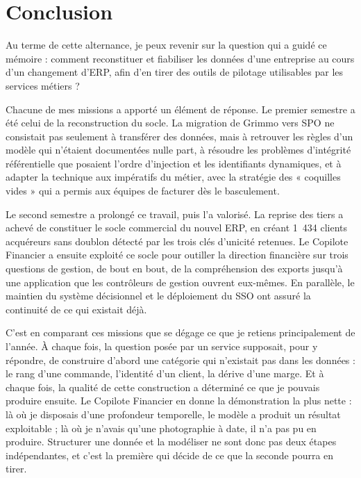 
\chapter*{Conclusion}

Au terme de cette alternance, je peux revenir sur la question qui a guidé ce mémoire : comment
reconstituer et fiabiliser les données d'une entreprise au cours d'un changement d'ERP, afin
d'en tirer des outils de pilotage utilisables par les services métiers ?

Chacune de mes missions a apporté un élément de réponse. Le premier semestre a été celui de la
reconstruction du socle. La migration de Grimmo vers SPO ne consistait pas seulement à
transférer des données, mais à retrouver les règles d'un modèle qui n'étaient documentées nulle
part, à résoudre les problèmes d'intégrité référentielle que posaient l'ordre d'injection et les
identifiants dynamiques, et à adapter la technique aux impératifs du métier, avec la stratégie
des « coquilles vides » qui a permis aux équipes de facturer dès le basculement.

Le second semestre a prolongé ce travail, puis l'a valorisé. La reprise des tiers a achevé de
constituer le socle commercial du nouvel ERP, en créant 1~434 clients acquéreurs sans doublon
détecté par les trois clés d'unicité retenues. Le Copilote Financier a ensuite exploité ce socle
pour outiller la direction financière sur trois questions de gestion, de bout en bout, de la
compréhension des exports jusqu'à une application que les contrôleurs de gestion ouvrent
eux-mêmes. En parallèle, le maintien du système décisionnel et le déploiement du SSO ont assuré
la continuité de ce qui existait déjà.

C'est en comparant ces missions que se dégage ce que je retiens principalement de l'année. À
chaque fois, la question posée par un service supposait, pour y répondre, de construire d'abord
une catégorie qui n'existait pas dans les données : le rang d'une commande, l'identité d'un
client, la dérive d'une marge. Et à chaque fois, la qualité de cette construction a déterminé ce
que je pouvais produire ensuite. Le Copilote Financier en donne la démonstration la plus nette :
là où je disposais d'une profondeur temporelle, le modèle a produit un résultat exploitable ; là
où je n'avais qu'une photographie à date, il n'a pas pu en produire. Structurer une donnée et la
modéliser ne sont donc pas deux étapes indépendantes, et c'est la première qui décide de ce que
la seconde pourra en tirer.

